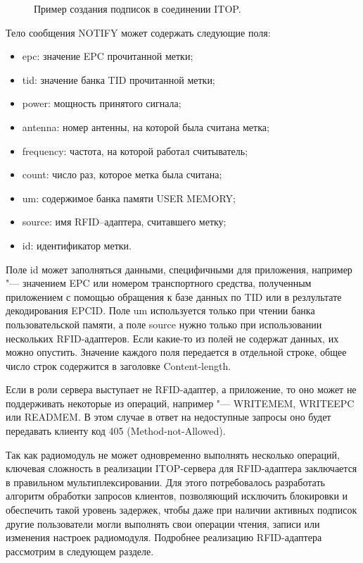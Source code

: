 \begin{figure}[ht]
  \caption{Пример создания подписок в соединении ITOP.}
  \label{fig:ch5_itop_session_2}
\end{figure}

Тело сообщения NOTIFY может содержать следующие поля:

\begin{itemize}
	\item epc: значение EPC прочитанной метки;
	\item tid: значение банка TID прочитанной метки;
	\item power: мощность принятого сигнала;
	\item antenna: номер антенны, на которой была считана метка;
	\item frequency: частота, на которой работал считыватель;
	\item count: число раз, которое метка была считана;
	\item um: содержимое банка памяти USER MEMORY;
	\item source: имя RFID--адаптера, считавшего метку;
	\item id: идентификатор метки.
\end{itemize}

Поле id может заполняться данными, специфичными для приложения, например "--- значением EPC или номером транспортного средства, полученным приложением с помощью обращения к базе данных по TID или в резлультате декодирования EPCID. Поле um используется только при чтении банка пользовательской памяти, а поле source нужно только при использовании нескольких RFID-адаптеров. Если какие-то из полей не содержат данных, их можно опустить. Значение каждого поля передается в отдельной строке, общее число строк содержится в заголовке Content-length.

Если в роли сервера выступает не RFID-адаптер, а приложение, то оно может не поддерживать некоторые из операций, например "--- WRITEMEM, WRITEEPC или READMEM. В этом случае в ответ на недоступные запросы оно будет передавать клиенту код 405 (Method-not-Allowed).

Так как радиомодуль не может одновременно выполнять несколько операций, ключевая сложность в реализации ITOP-сервера для RFID-адаптера заключается в правильном мультиплексировании. Для этого потребовалось разработать алгоритм обработки запросов клиентов, позволяющий исключить блокировки и обеспечить такой уровень задержек, чтобы даже при наличии активных подписок другие пользователи могли выполнять свои операции чтения, записи или изменения настроек радиомодуля. Подробнее реализацию RFID-адаптера рассмотрим в следующем разделе.


